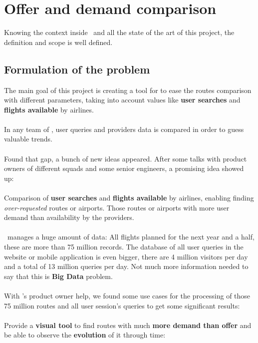 
\chapter{Offer and demand comparison}

\label{chapter03}

Knowing the context inside \company\ and all the state of the art of this project, the definition and scope is well defined.


\section{Formulation of the problem} \label{problem}

The main goal of this project is creating a tool for \textit{\company} to ease the routes comparison with different parameters, taking into account values like \textbf{user searches} and \textbf{flights available} by airlines.
\\\\
In any team of \company, user queries and providers data is compared in order to guess valuable trends.
\\\\
Found that gap, a bunch of new ideas appeared. After some talks with product owners of different squads and some senior engineers, a promising idea showed up:
\\\\
Comparison of \textbf{user searches} and \textbf{flights available} by airlines, enabling finding \textit{over-requested} routes or airports. Those routes or airports with more user demand than availability by the providers.
\\\\
\squad\ manages a huge amount of data: All flights planned for the next year and a half, these are more than 75 million records. The database of all user queries in the website or mobile application is even bigger, there are 4 million visitors per day and a total of 13 million queries per day. Not much more information needed to say that this is \textbf{Big Data} problem.
\\\\
With \squad's product owner help, we found some use cases for the processing of those 75 million routes and all user session's queries to get some significant results:
\\\\
Provide a \textbf{visual tool} to find routes with much \textbf{more demand than offer} and be able to observe the \textbf{evolution} of it {through time}:

